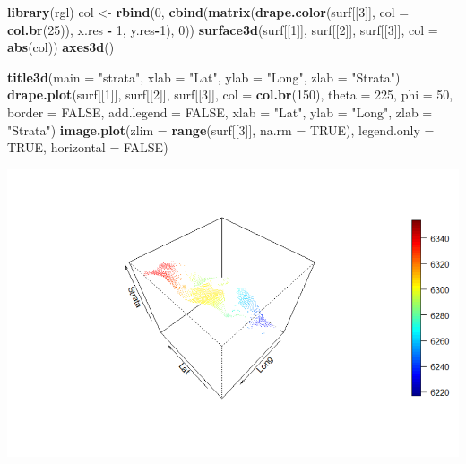 \documentclass[]{article}
\newenvironment{Shaded}{\begin{snugshade}}{\end{snugshade}}
\newcommand{\KeywordTok}[1]{\textcolor[rgb]{0.13,0.29,0.53}{\textbf{#1}}}
\newcommand{\DataTypeTok}[1]{\textcolor[rgb]{0.13,0.29,0.53}{#1}}
\newcommand{\DecValTok}[1]{\textcolor[rgb]{0.00,0.00,0.81}{#1}}
\newcommand{\StringTok}[1]{\textcolor[rgb]{0.31,0.60,0.02}{#1}}
\newcommand{\OtherTok}[1]{\textcolor[rgb]{0.56,0.35,0.01}{#1}}
\newcommand{\OperatorTok}[1]{\textcolor[rgb]{0.81,0.36,0.00}{\textbf{#1}}}
\newcommand{\NormalTok}[1]{#1}
\begin{document}
\begin{Shaded}
\begin{Highlighting}[]
\KeywordTok{library}\NormalTok{(rgl)}
\NormalTok{col <-}\StringTok{ }\KeywordTok{rbind}\NormalTok{(}\DecValTok{0}\NormalTok{, }\KeywordTok{cbind}\NormalTok{(}\KeywordTok{matrix}\NormalTok{(}\KeywordTok{drape.color}\NormalTok{(surf[[}\DecValTok{3}\NormalTok{]],}
                                         \DataTypeTok{col =} \KeywordTok{col.br}\NormalTok{(}\DecValTok{25}\NormalTok{)), x.res }\OperatorTok{-}\StringTok{ }\DecValTok{1}\NormalTok{, y.res}\OperatorTok{-}\DecValTok{1}\NormalTok{), }\DecValTok{0}\NormalTok{))}
\KeywordTok{surface3d}\NormalTok{(surf[[}\DecValTok{1}\NormalTok{]], surf[[}\DecValTok{2}\NormalTok{]], surf[[}\DecValTok{3}\NormalTok{]], }\DataTypeTok{col =} \KeywordTok{abs}\NormalTok{(col))}
\KeywordTok{axes3d}\NormalTok{()}

\KeywordTok{title3d}\NormalTok{(}\DataTypeTok{main =} \StringTok{"strata"}\NormalTok{, }\DataTypeTok{xlab =} \StringTok{"Lat"}\NormalTok{, }\DataTypeTok{ylab =} \StringTok{"Long"}\NormalTok{, }\DataTypeTok{zlab =} \StringTok{"Strata"}\NormalTok{)}
\KeywordTok{drape.plot}\NormalTok{(surf[[}\DecValTok{1}\NormalTok{]], surf[[}\DecValTok{2}\NormalTok{]], surf[[}\DecValTok{3}\NormalTok{]],}
           \DataTypeTok{col =} \KeywordTok{col.br}\NormalTok{(}\DecValTok{150}\NormalTok{), }\DataTypeTok{theta =} \DecValTok{225}\NormalTok{, }\DataTypeTok{phi =} \DecValTok{50}\NormalTok{,}
           \DataTypeTok{border =} \OtherTok{FALSE}\NormalTok{, }\DataTypeTok{add.legend =} \OtherTok{FALSE}\NormalTok{,}
           \DataTypeTok{xlab =} \StringTok{"Lat"}\NormalTok{, }\DataTypeTok{ylab =} \StringTok{"Long"}\NormalTok{, }\DataTypeTok{zlab =} \StringTok{"Strata"}\NormalTok{)}
\KeywordTok{image.plot}\NormalTok{(}\DataTypeTok{zlim =} \KeywordTok{range}\NormalTok{(surf[[}\DecValTok{3}\NormalTok{]], }\DataTypeTok{na.rm =} \OtherTok{TRUE}\NormalTok{),}
           \DataTypeTok{legend.only =} \OtherTok{TRUE}\NormalTok{, }\DataTypeTok{horizontal =} \OtherTok{FALSE}\NormalTok{)}
\end{Highlighting}
\end{Shaded}

\includegraphics{homework2_files/figure-latex/ex6_3dd-1.pdf}
\end{document}
